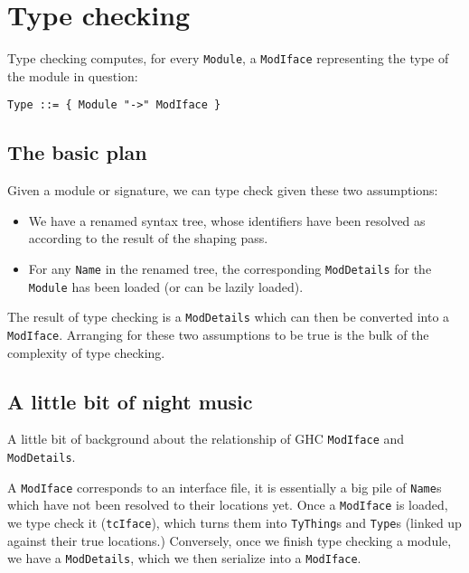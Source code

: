 \documentclass{article}
\begin{document}
\newpage

\section{Type checking}

Type checking computes, for every \verb|Module|, a \verb|ModIface|
representing the type of the module in question:

\begin{verbatim}
Type ::= { Module "->" ModIface }
\end{verbatim}

\subsection{The basic plan}

Given a module or signature, we can type check given these two assumptions:

\begin{itemize}
    \item We have a renamed syntax tree, whose identifiers have been
          resolved as according to the result of the shaping pass.
    \item For any \verb|Name| in the renamed tree, the corresponding
          \verb|ModDetails| for the \verb|Module| has been loaded
          (or can be lazily loaded).
\end{itemize}

The result of type checking is a \verb|ModDetails| which can then be
converted into a \verb|ModIface|.
Arranging for these two assumptions to be true is the bulk of the
complexity of type checking.

\subsection{A little bit of night music}

A little bit of background about the relationship of GHC \verb|ModIface| and
\verb|ModDetails|.

A \verb|ModIface| corresponds to an interface file, it is essentially a
big pile of \verb|Name|s which have not been resolved to their locations
yet.  Once a \verb|ModIface| is loaded, we type check it
(\verb|tcIface|), which turns them into \verb|TyThing|s and \verb|Type|s
(linked up against their true locations.) Conversely, once we finish
type checking a module, we have a \verb|ModDetails|, which we then
serialize into a \verb|ModIface|.
\end{document}
